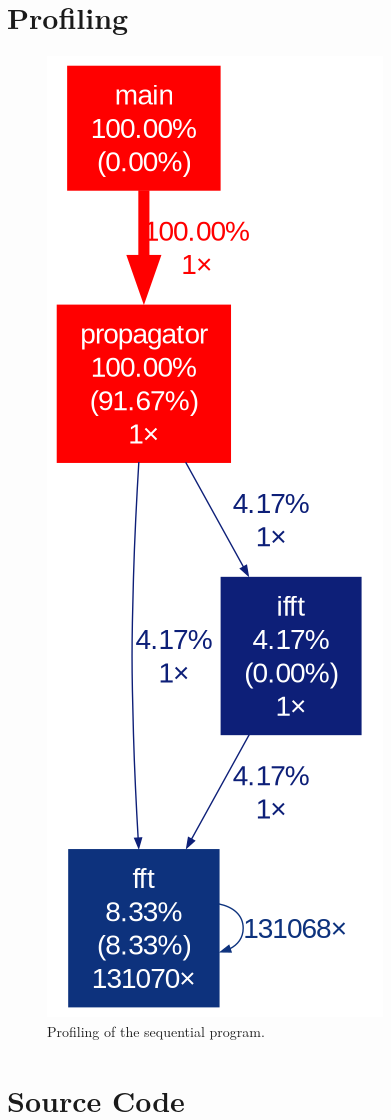 \documentclass{article}
\begin{document}
\section{Profiling}
\label{sec:Profiling}
\begin{figure}[ht]
    \includegraphics[height=0.6\textheight]{figures/gprof_seq.png}
    \centering
    \caption*{Profiling of the sequential program.}
\end{figure}
\FloatBarrier
\section{Source Code}
\label{sec:source}

\end{document}
